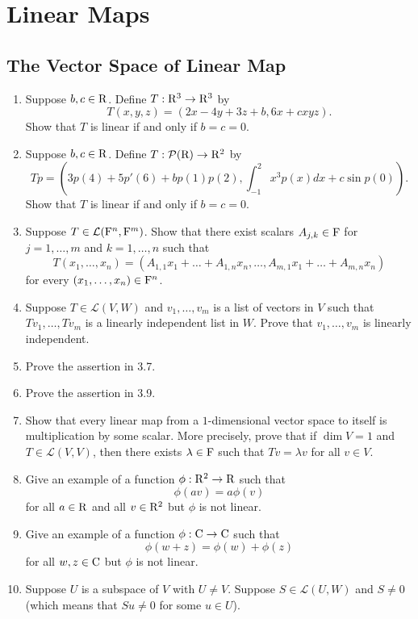 \section{Linear Maps}

\subsection{The Vector Space of Linear Map}

\begin{enumerate}
    \item Suppose $b,c \in \mathrm{R}$. Define $T: \mathrm{R}^3 \to \mathrm{R}^3$ by 
        \[ T(x,y,z) = (2x-4y+3z+b, 6x+cxyz).\]
        Show that $T$ is linear if and only if $b=c=0$.
    \item Suppose $b,c \in \mathrm{R}$. Define $T: \mathcal{P}(\mathrm{R}) \to \mathrm{R}^2$ by 
        \[ Tp = \left(3p(4)+5p'(6)+bp(1)p(2), \int_{-1}^{2}x^3p(x)dx + c\sin p(0)\right).\]
        Show that $T$ is linear if and only if $b = c = 0$.
    \item Suppose $T \in \mathcal{L}(\mathrm{F}^n, \mathrm{F}^m)$. Show that there exist scalars $A_{j,k} \in \mathrm{F}$ for $j=1,\ldots,m$ and $k=1,\ldots,n$ such that 
        \[T(x_1,\ldots,x_n) = (A_{1,1}x_1+\dots+A_{1,n}x_n, \ldots, A_{m,1}x_1+\dots +A_{m,n}x_n)\]
        for every $(x_1,\ldots,x_n) \in \mathrm{F}^n$.
    \item Suppose $T \in \mathcal{L}(V,W)$ and $v_1, \ldots,v_m$ is a list of vectors in $V$ such that $Tv_1,\ldots,Tv_m$ is a linearly independent list 
        in $W$. Prove that $v_1, \ldots, v_m$ is linearly independent.
    \item Prove the assertion in 3.7.
    \item Prove the assertion in 3.9.  
    \item Show that every linear map from a $1$-dimensional vector space to itself is multiplication by some scalar. More precisely, prove that if $\dim{V}=1$
        and $T \in \mathcal{L}(V,V)$, then there exists $\lambda \in \mathrm{F}$ such that $Tv = \lambda v$ for all $v \in V$.
    \item Give an example of a function $\phi: \mathrm{R}^2 \to \mathrm{R}$ such that 
        \[ \phi(av) = a\phi(v)\]
        for all $a \in \mathrm{R}$ and all $v \in \mathrm{R}^2$ but $\phi$ is not linear.
    \item Give an example of a function $\phi: \mathrm{C} \to \mathrm{C}$ such that 
        \[ \phi(w+z) = \phi(w) + \phi(z)\]
        for all $w,z \in \mathrm{C}$ but $\phi$ is not linear.
    \item Suppose $U$ is a subspace of $V$ with $U \neq V$. Suppose $S \in \mathcal{L}(U,W)$ and $S \neq 0$(which means that $Su \neq 0$ for some $u \in U$).

\end{enumerate}
